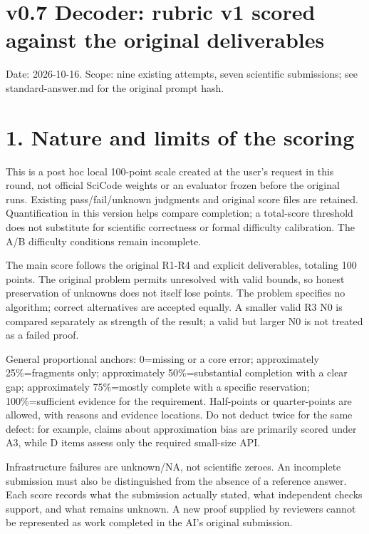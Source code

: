 \documentclass[11pt,a4paper]{article}
\begin{document}
\section*{v0.7 Decoder: rubric v1 scored against the original deliverables}

Date: 2026-10-16. Scope: nine existing attempts, seven scientific submissions; see standard-answer.md for the original prompt hash.

\section*{1. Nature and limits of the scoring}

This is a post hoc local 100-point scale created at the user's request in this round, not official SciCode weights or an evaluator frozen before the original runs. Existing pass/\allowbreak{}fail/\allowbreak{}unknown judgments and original score files are retained. Quantification in this version helps compare completion; a total-score threshold does not substitute for scientific correctness or formal difficulty calibration. The A/\allowbreak{}B difficulty conditions remain incomplete.

The main score follows the original R1-R4 and explicit deliverables, totaling 100 points. The original problem permits unresolved with valid bounds, so honest preservation of unknowns does not itself lose points. The problem specifies no algorithm; correct alternatives are accepted equally. A smaller valid R3 N0 is compared separately as strength of the result; a valid but larger N0 is not treated as a failed proof.

General proportional anchors: 0=missing or a core error; approximately 25\%=fragments only; approximately 50\%=substantial completion with a clear gap; approximately 75\%=mostly complete with a specific reservation; 100\%=sufficient evidence for the requirement. Half-points or quarter-points are allowed, with reasons and evidence locations. Do not deduct twice for the same defect: for example, claims about approximation bias are primarily scored under A3, while D items assess only the required small-size API.

Infrastructure failures are unknown/\allowbreak{}NA, not scientific zeroes. An incomplete submission must also be distinguished from the absence of a reference answer. Each score records what the submission actually stated, what independent checks support, and what remains unknown. A new proof supplied by reviewers cannot be represented as work completed in the AI's original submission.
\end{document}
